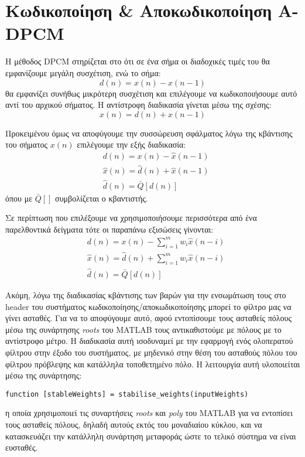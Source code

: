 \section{Κωδικοποίηση \& Αποκωδικοποίηση A-DPCM}

Η μέθοδος DPCM στηρίζεται στο ότι σε ένα σήμα οι διαδοχικές τιμές του θα εμφανίζουμε μεγάλη
συσχέτιση, ενώ το σήμα:
\begin{equation}
  \label{eq:diff_signal}
  d(n) = x(n) - x(n-1)
\end{equation}
\noindent θα εμφανίζει συνήθως μικρότερη συσχέτιση και επιλέγουμε να κωδικοποιήσουμε αυτό αντί του
αρχικού σήματος. Η αντίστροφη διαδικασία γίνεται μέσω της σχέσης:
\begin{equation}
  \label{eq:invert_diff}
  x(n) = d(n) + x(n-1)
\end{equation}
\par Προκειμένου όμως να αποφύγουμε την συσσώρευση σφάλματος λόγω της κβάντισης του σήματος $x(n)$
επιλέγουμε την εξής διαδικασία:
\begin{align}
  &d(n) = x(n) - \hat{x}(n-1) \label{eq:dpcm_dpcm}\\
  &\hat{x}(n) = \hat{d}(n) + \hat{x}(n-1) \label{eq:xhat_dpcm} \\
  &\hat{d}(n) = \bar{Q}[d(n)] \label{eq:diff_quantized}
\end{align}
\noindent όπου με $\bar{Q}[]$ συμβολίζεται ο κβαντιστής.

\par Σε περίπτωση που επιλέξουμε να χρησιμοποιήσουμε περισσότερα από ένα παρελθοντικά δείγματα τότε
οι παραπάνω εξισώσεις γίνονται:
\begin{align}
  &d(n) = x(n) - \sum_{i=1}^m w_i \hat{x}(n-i)  \label{eq:diff_adpcm}\\
  &\hat{x}(n) = \hat{d}(n) + \sum_{i=1}^m w_i \hat{x}(n-i) \label{eq:xhat_adpcm} \\
  &\hat{d}(n) = \bar{Q}[d(n)] \label{eq:diff_quantized_adpcm}
\end{align}

\par Ακόμη, λόγω της διαδικασίας κβάντισης των βαρών για την ενσωμάτωση τους στο header του
συστήματος κωδικοποίησης/αποκωδικοποίησης μπορεί το φίλτρο μας να γίνει ασταθές. Για να το
αποφύγουμε αυτό, αφού εντοπίσουμε τους ασταθείς πόλους μέσω της συνάρτησης \emph{roots} του MATLAB
τους αντικαθιστούμε με πόλους με το αντίστροφο μέτρο. Η διαδικασία αυτή ισοδυναμεί με την εφαρμογή
ενός ολοπερατού φίλτρου στην έξοδο του συστήματος, με μηδενικό στην θέση του ασταθούς πόλου του
φίλτρου πρόβλεψης και κατάλληλα τοποθετημένο πόλο. Η λειτουργία αυτή υλοποιείται μέσω της
συνάρτησης:
\begin{lstlisting}[style=myMatlab]
function [stableWeights] = stabilise_weights(inputWeights)
\end{lstlisting}
\noindent η οποία χρησιμοποιεί τις συναρτήσεις \emph{roots} και \emph{poly} του MATLAB για να
εντοπίσει τους ασταθείς πόλους, δηλαδή αυτούς εκτός του μοναδιαίου κύκλου, και να κατασκευάζει την
κατάλληλη συνάρτηση μεταφοράς ώστε το τελικό σύστημα να είναι ευσταθές.

